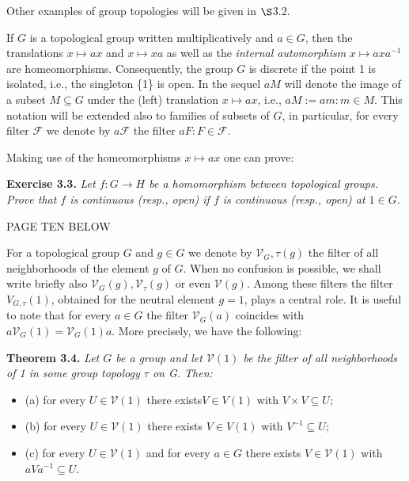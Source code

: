 \documentclass[12pt]{article}
\begin{document}
    
        Other examples of group topologies will be given in $\S$3.2.
    
    
        If $G$ is a topological group written multiplicatively and $a \in G$, then the translations $x \mapsto ax$ and $x \mapsto xa$
    as well as the \emph{internal automorphism} $x \mapsto axa^{-1}$ are homeomorphisms. Consequently, the group $G$ is discrete
    if the point 1 is isolated, i.e., the singleton \{1\} is open. In the sequel $aM$ will denote the image of a subset
    $M \subseteq G$ under the (left) translation $x \mapsto ax$, i.e., $aM := {am : m \in M}$. This notation will be extended also to
    families of subsets of $G$, in particular, for every filter $\mathcal{F}$ we denote by $a \mathcal{F}$ the filter ${aF : F \in \mathcal{F}}$.
    
    
        Making use of the homeomorphisms $x \mapsto ax$ one can prove:


    \textbf{Exercise 3.3.} \emph{Let $f : G \to H$ be a homomorphism between topological groups. Prove that $f$ is continuous
    (resp., open) if $f$ is continuous (resp., open) at $1 \in G$.}



        PAGE TEN BELOW



        For a topological group $G$ and $g \in G$ we denote by $\mathcal{V}_G,\tau (g)$ the filter of all neighborhoods of the element $g$
    of $G$. When no confusion is possible, we shall write briefly also $\mathcal{V}_G(g), \mathcal{V}_{\tau} (g)$ or even $\mathcal{V}(g)$. Among these filters
    the filter $V_{G,\tau} (1)$, obtained for the neutral element $g = 1$, plays a central role. It is useful to note that for every
    $a \in G$ the filter $\mathcal{V}_G (a)$ coincides with $a \mathcal{V}_G (1) = \mathcal{V}_G (1) a$. More precisely, we have the following:
    
    
    \textbf{Theorem 3.4.} \emph{Let $G$ be a group and let $\mathcal{V}(1)$ be the filter of all neighborhoods of 1 in some group topology $\tau$
    on G. Then:}


    \begin{itemize}

        \item (a) for every $U \in \mathcal{V}(1)$ there exists$ V \in V(1)$ with $V \times V \subseteq U$;
    
        \item (b) for every $U \in \mathcal{V}(1)$ there exists $V \in V(1)$ with $V^{-1} \subseteq U$;
    
        \item (c) for every $U \in \mathcal{V}(1)$ and for every $a \in G$ there exists $V \in \mathcal{V}(1)$ with $aV a^{-1} \subseteq U$.
    
    \end{itemize}
\end{document}
